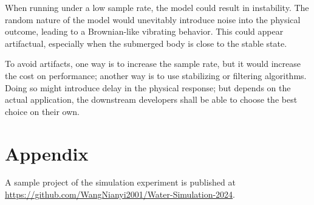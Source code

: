 When running under a low sample rate, the model could result in instability.
The random nature of the model would unevitably introduce noise into the physical outcome, leading to a Brownian-like vibrating behavior.
This could appear artifactual, especially when the submerged body is close to the stable state.

To avoid artifacts, one way is to increase the sample rate, but it would increase the cost on performance;
another way is to use stabilizing or filtering algorithms.
Doing so might introduce delay in the physical response;
but depends on the actual application, the downstream developers shall be able to choose the best choice on their own.

\begin{comment}
\section*{Postscripts and Acknowledgements}

This is the first time I have ever written a serious academical article.
It is guaranteed that there will be naive mistakes all over the place.
Please excuse me, thou reader.
If thou hast spotted any mistake, please feel free to contact me at \url{wangnianyi2001@outlook.com}.
My apologies in advance!

Thanks to the team of my graduation project, \emph{Nani Core} (\url{https://github.com/nani-core}).
The idea of this article rose when I was making the water system in the project.
They established the possibilty for this article to happen.
Special thanks to 陈恩晖 (Omnisch) and 张嘉玥 (Limko).
They are two really, really reliable co-workers and good friends of mine.
They have given me the greatest mental and physical support on the project, and an unforgetful memory in my graduation year.
\end{comment}

\section*{Appendix}

A sample project of the simulation experiment is published at \url{https://github.com/WangNianyi2001/Water-Simulation-2024}.